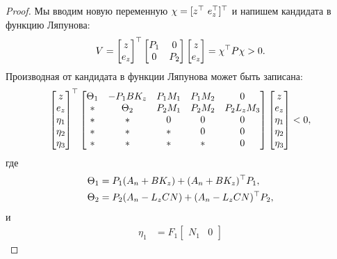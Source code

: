 \begin{proof}
	Мы вводим новую переменную $\chi = [z^\top \ e_z^\top ]^\top$ и напишем кандидата в функцию Ляпунова:
	\begin{equation}
		\label{eq:thm3_Lyapunov_candidat}
		V = \begin{bmatrix}
			z  \\ e_z
		\end{bmatrix}^\top
		\begin{bmatrix}
			{P}_1 & 0 \\
			0 & {P}_2
		\end{bmatrix}
		\begin{bmatrix}
			z \\
			e_z
		\end{bmatrix}
		=
		\chi^\top {P} \chi >0.
	\end{equation}
	Производная от кандидата в функции Ляпунова может быть записана:
	\begin{equation}
		\label{eq:thm3_after_Lyapunov}
		\begin{bmatrix}
			z \\ e_z \\ \eta_1 \\ \eta_2 \\ \eta_3
		\end{bmatrix}^\top
		\begin{bmatrix}
			{\Theta}_1 & -{P}_1{B}{K}_z & {P}_1{M}_1 & {P}_1{M}_2 &0 \\
			* &    {\Theta}_2 & {P}_2{M}_1 & {P}_2{M}_2 & {P}_2{L}_z{M}_3\\
			* & * & 0 & 0&0\\
			* & * & * & 0&0 \\
			* & * & * & *&0
		\end{bmatrix}
		\begin{bmatrix}
			z \\ e_z \\ \eta_1 \\ \eta_2 \\ \eta_3
		\end{bmatrix}<0,
	\end{equation}
	где
	\begin{align}
		{\Theta}_1&={P}_1({A}_n+{B}{K}_z)+({A}_n+{B}{K}_z)^\top{P}_1 ,\\
		{\Theta}_2&={P}_2({A}_n-{L}_z{CN})+({A}_n-{L}_z{CN})^\top{P}_2,
	\end{align}
	и
	\begin{align}
		\eta_1&={F}_1\begin{bmatrix}
			{N}_1 &0

\end{bmatrix}
\end{align}
\end{proof}
